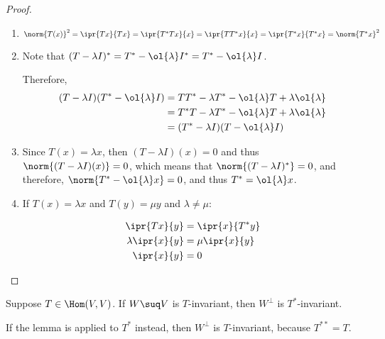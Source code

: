 \documentclass[11pt]{scrartcl}
\begin{document}
\begin{proof}
  \hfill
  
  \begin{enumerate}[label=\alph*)]
  \item $\norm{T(x)}^2 = \ipr{Tx}{Tx} = \ipr{T^{*}Tx}{x} = \ipr{TT^{*}x}{x} = \ipr{T^{*}x}{T^{*}x} = \norm{T^{*}x}^2$
  \item Note that $(T-\lambda I)^{*} = T^{*}-\ol{\lambda} I^{*} =  T^{*} - \ol{\lambda}I$.

    Therefore,
    \begin{align}
      (T-\lambda I)(T^{*} - \ol{\lambda}I) & = TT^{*} - \lambda T^{*} - \ol{\lambda}T + \lambda \ol{\lambda} \\
                                           & = T^{*}T - \lambda T^{*} - \ol{\lambda}T + \lambda \ol{\lambda} \\
                                           & =      (T^{*}-\lambda I)(T - \ol{\lambda}I)
    \end{align}
  \item Since $T(x) = \lambda x$, then $(T-\lambda I)(x) = 0$ and thus
    $\norm{(T-\lambda I)(x)} = 0$, which means that $\norm{(T-\lambda I)^{*}} = 0$, and therefore, $\norm{T^{*} - \ol{\lambda} x} = 0$, and thus $T^{*} = \ol{\lambda}x$.
  \item If $T(x) = \lambda x$ and $T(y) = \mu y$ and $\lambda  \neq \mu$:

    \begin{align}
      \ipr{Tx}{y} &= \ipr{x}{T^{*}y}\\
      \lambda \ipr{x}{y} &= \mu \ipr{x}{y}\\
      \ipr{x}{y} &= 0      
    \end{align}    
  \end{enumerate}
\end{proof}

\begin{lemma}
  \label{sec:infin-dimens-inner}
  Suppose $T \in \Hom(V,V)$. If $W\suq V$ is $T$-invariant, then $W^{\bot}$ is $T^{*}$-invariant.
\end{lemma}
\begin{remark}
If the lemma is applied to $T^{*}$ instead, then $W^{\bot}$ is $T$-invariant, because $T^{**}= T$.
\end{remark}
\end{document}
